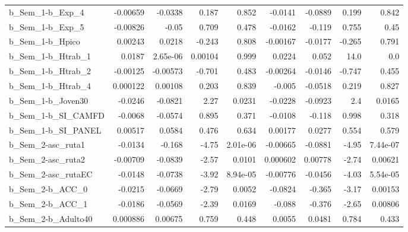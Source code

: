 \begin{tabular}{lrrrrrrrr}
b\_Sem\_1-b\_Exp\_4            &    -0.00659 &      -0.0338 &    0.187 &    0.852 &    -0.0141 &     -0.0889 &        0.199 &         0.842 \\
b\_Sem\_1-b\_Exp\_5            &    -0.00826 &        -0.05 &    0.709 &    0.478 &    -0.0162 &      -0.119 &        0.755 &          0.45 \\
b\_Sem\_1-b\_Hpico            &     0.00243 &       0.0218 &   -0.243 &    0.808 &   -0.00167 &     -0.0177 &       -0.265 &         0.791 \\
b\_Sem\_1-b\_Htrab\_1          &      0.0187 &     2.65e-06 &  0.00104 &    0.999 &     0.0224 &       0.052 &         14.0 &           0.0 \\
b\_Sem\_1-b\_Htrab\_2          &    -0.00125 &     -0.00573 &   -0.701 &    0.483 &   -0.00264 &     -0.0146 &       -0.747 &         0.455 \\
b\_Sem\_1-b\_Htrab\_4          &    0.000122 &      0.00108 &    0.203 &    0.839 &     -0.005 &     -0.0518 &        0.219 &         0.827 \\
b\_Sem\_1-b\_Joven30          &     -0.0246 &      -0.0821 &     2.27 &   0.0231 &    -0.0228 &     -0.0923 &          2.4 &        0.0165 \\
b\_Sem\_1-b\_SI\_CAMFD         &     -0.0068 &      -0.0574 &    0.895 &    0.371 &    -0.0108 &      -0.118 &        0.998 &         0.318 \\
b\_Sem\_1-b\_SI\_PANEL         &     0.00517 &       0.0584 &    0.476 &    0.634 &    0.00177 &      0.0277 &        0.554 &         0.579 \\
b\_Sem\_2-asc\_ruta1          &     -0.0134 &       -0.168 &    -4.75 & 2.01e-06 &   -0.00665 &     -0.0881 &        -4.95 &      7.44e-07 \\
b\_Sem\_2-asc\_ruta2          &    -0.00709 &      -0.0839 &    -2.57 &   0.0101 &   0.000602 &     0.00778 &        -2.74 &       0.00621 \\
b\_Sem\_2-asc\_rutaEC         &     -0.0148 &      -0.0738 &    -3.92 & 8.94e-05 &   -0.00776 &     -0.0456 &        -4.03 &      5.54e-05 \\
b\_Sem\_2-b\_ACC\_0            &     -0.0215 &      -0.0669 &    -2.79 &   0.0052 &    -0.0824 &      -0.365 &        -3.17 &       0.00153 \\
b\_Sem\_2-b\_ACC\_1            &     -0.0186 &      -0.0569 &    -2.39 &   0.0169 &     -0.088 &      -0.376 &        -2.65 &       0.00806 \\
b\_Sem\_2-b\_Adulto40         &    0.000886 &      0.00675 &    0.759 &    0.448 &     0.0055 &      0.0481 &        0.784 &         0.433 \\

\end{tabular}
